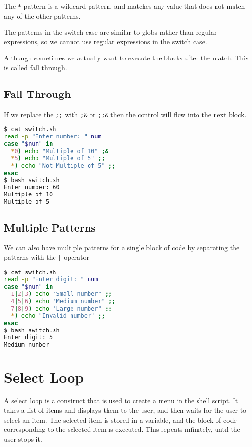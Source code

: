 The \lstinline{*} pattern is a wildcard pattern, and matches any value that does not match any of the other patterns.

The patterns in the switch case are similar to globs rather than regular expressions, so we cannot use regular expressions in the switch case.

Although sometimes we actually want to execute the blocks after the match. This is called fall through.

\subsection{Fall Through}

If we replace the \lstinline|;;| with \lstinline|;&| or \lstinline|;;&| then the control will flow into the next block.

\begin{lstlisting}[language=bash]
$ cat switch.sh
read -p "Enter number: " num
case "$num" in
  *0) echo "Multiple of 10" ;&
  *5) echo "Multiple of 5" ;;
  *) echo "Not Multiple of 5" ;;
esac
$ bash switch.sh
Enter number: 60
Multiple of 10
Multiple of 5
\end{lstlisting}

\subsection{Multiple Patterns}

We can also have multiple patterns for a single block of code by separating the patterns with the \lstinline{|} operator.

\begin{lstlisting}[language=bash]
$ cat switch.sh
read -p "Enter digit: " num
case "$num" in
  1|2|3) echo "Small number" ;;
  4|5|6) echo "Medium number" ;;
  7|8|9) echo "Large number" ;;
  *) echo "Invalid number" ;;
esac
$ bash switch.sh
Enter digit: 5
Medium number
\end{lstlisting}

\section{Select Loop}

\begin{definition}
  A select loop is a construct that is used to create a menu in the shell script. It takes a list of items and displays them to the user, and then waits for the user to select an item. The selected item is stored in a variable, and the block of code corresponding to the selected item is executed.
  This repeats infinitely, until the user stops it.
\end{definition}

